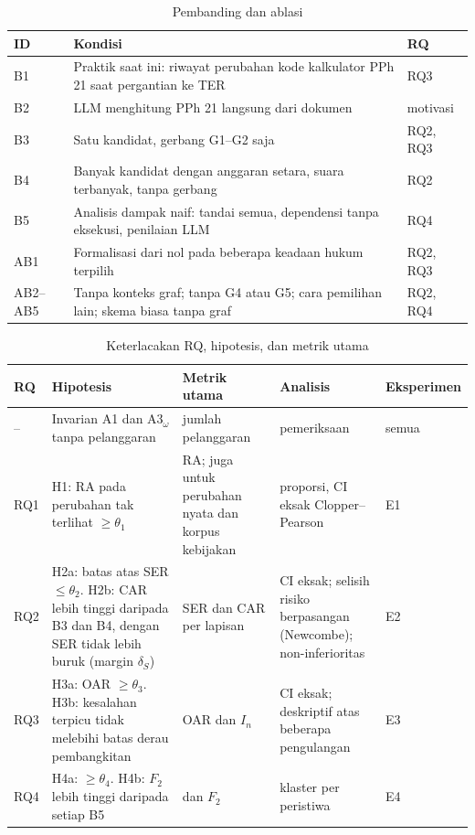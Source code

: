 \begin{table}[t]
\centering
\caption{Pembanding dan ablasi}
\label{tab:pembanding}
\scriptsize
\begin{tabularx}{\columnwidth}{@{}P{0.55cm} L P{0.85cm}@{}}
\toprule
\textbf{ID} & \textbf{Kondisi} & \textbf{RQ} \\
\midrule
B1 & Praktik saat ini: riwayat perubahan kode kalkulator PPh 21  saat pergantian ke TER & RQ3 \\
B2 & LLM menghitung PPh 21 langsung dari dokumen & motivasi \\
B3 & Satu kandidat, gerbang G1--G2 saja & RQ2, RQ3 \\
B4 & Banyak kandidat dengan anggaran setara, suara terbanyak, tanpa gerbang & RQ2 \\
B5 & Analisis dampak naif: tandai semua, dependensi tanpa eksekusi, penilaian LLM & RQ4 \\
AB1 & Formalisasi dari nol pada beberapa keadaan hukum terpilih & RQ2, RQ3 \\
AB2--AB5 & Tanpa konteks graf; tanpa G4 atau G5; cara pemilihan lain; skema biasa tanpa graf & RQ2, RQ4 \\
\bottomrule
\end{tabularx}
\end{table}

\begin{table}[t]
\centering
\caption{Keterlacakan RQ, hipotesis, dan metrik utama}
\label{tab:lacak}
\scriptsize
\begin{tabularx}{\textwidth}{@{}P{0.8cm} L P{3.6cm} P{3.4cm} P{1.1cm}@{}}
\toprule
\textbf{RQ} & \textbf{Hipotesis} & \textbf{Metrik utama} & \textbf{Analisis} & \textbf{Eksperimen} \\
\midrule
-- & Invarian A1 dan A3$_\omega$ tanpa pelanggaran & jumlah pelanggaran & pemeriksaan & semua \\
RQ1 & H1: RA pada perubahan tak terlihat $\geq \theta_1$ & RA; juga untuk perubahan nyata dan korpus kebijakan & proporsi, CI eksak Clopper--Pearson & E1 \\
RQ2 & H2a: batas atas SER $\leq \theta_2$. H2b: CAR lebih tinggi daripada B3 dan B4, dengan SER tidak lebih buruk (margin $\delta_S$) & SER dan CAR per lapisan & CI eksak; selisih risiko berpasangan (Newcombe); non-inferioritas & E2 \\
RQ3 & H3a: OAR $\geq \theta_3$. H3b: kesalahan terpicu tidak melebihi batas derau pembangkitan & OAR dan $I_n$ & CI eksak; deskriptif atas beberapa pengulangan & E3 \\
RQ4 & H4a:  $\geq \theta_4$. H4b: $F_2$ lebih tinggi daripada setiap B5 &  dan $F_2$ &  klaster per peristiwa & E4 \\
\bottomrule
\end{tabularx}
\end{table}

